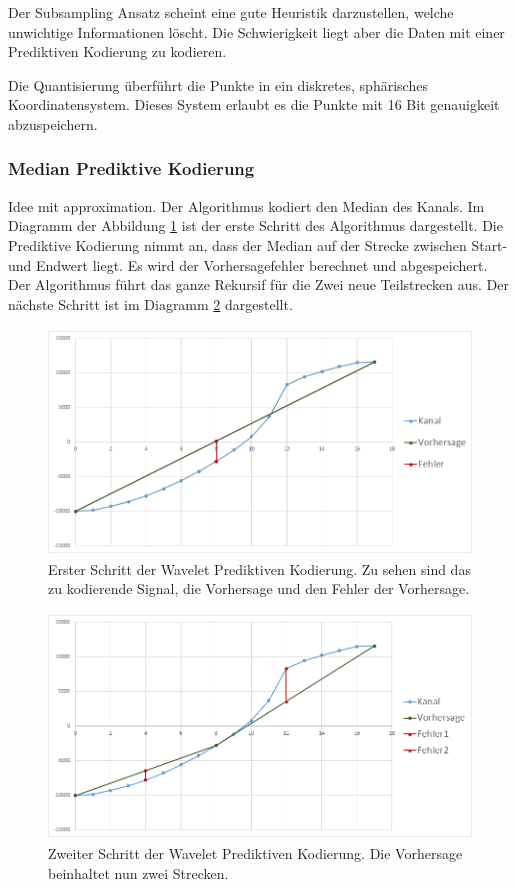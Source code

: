 Der Subsampling Ansatz scheint eine gute Heuristik darzustellen, welche unwichtige Informationen löscht. Die Schwierigkeit liegt aber die Daten mit einer Prediktiven Kodierung zu kodieren. 

Die Quantisierung überführt die Punkte in ein diskretes, sphärisches Koordinatensystem. Dieses System erlaubt es die Punkte mit 16 Bit genauigkeit abzuspeichern. 

\subsubsection{Median Prediktive Kodierung}
Idee mit approximation.
Der Algorithmus kodiert den Median des Kanals. Im Diagramm der Abbildung \ref{konzept:loesung2:algorithm:step1} ist der erste Schritt des Algorithmus dargestellt. Die Prediktive Kodierung nimmt an, dass der Median auf der Strecke zwischen Start- und Endwert liegt. Es wird der Vorhersagefehler berechnet und abgespeichert. Der Algorithmus führt das ganze Rekursif für die Zwei neue Teilstrecken aus. Der nächste Schritt ist im Diagramm \ref{konzept:loesung2:algorithm:step2} dargestellt.\\
\begin{figure}[!htbp]
	\center
	\includegraphics[width=1\textwidth,height=6cm,keepaspectratio]{./pictures/konzept/solution2/algorithm_step1.png}
	\caption{Erster Schritt der Wavelet Prediktiven Kodierung. Zu sehen sind das zu kodierende Signal, die Vorhersage und den Fehler der Vorhersage.}
	\label{konzept:loesung2:algorithm:step1}
\end{figure} 
\begin{figure}[!htbp]
	\center
	\includegraphics[width=1\textwidth,height=6cm,keepaspectratio]{./pictures/konzept/solution2/algorithm_step2.png}
	\caption{Zweiter Schritt der Wavelet Prediktiven Kodierung. Die Vorhersage beinhaltet nun zwei Strecken.}
	\label{konzept:loesung2:algorithm:step2}
\end{figure} 


